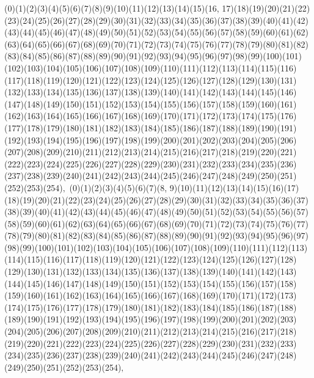 \documentclass[12pt]{article}
\begin{document}
{(0)(1)(2)(3)(4)(5)(6)(7)(8)(9)(10)(11)(12)(13)(14)(15)(16, 17)(18)(19)(20)(21)(22)(23)(24)(25)(26)(27)(28)(29)(30)(31)(32)(33)(34)(35)(36)(37)(38)(39)(40)(41)(42)(43)(44)(45)(46)(47)(48)(49)(50)(51)(52)(53)(54)(55)(56)(57)(58)(59)(60)(61)(62)(63)(64)(65)(66)(67)(68)(69)(70)(71)(72)(73)(74)(75)(76)(77)(78)(79)(80)(81)(82)(83)(84)(85)(86)(87)(88)(89)(90)(91)(92)(93)(94)(95)(96)(97)(98)(99)(100)(101)(102)(103)(104)(105)(106)(107)(108)(109)(110)(111)(112)(113)(114)(115)(116)(117)(118)(119)(120)(121)(122)(123)(124)(125)(126)(127)(128)(129)(130)(131)(132)(133)(134)(135)(136)(137)(138)(139)(140)(141)(142)(143)(144)(145)(146)(147)(148)(149)(150)(151)(152)(153)(154)(155)(156)(157)(158)(159)(160)(161)(162)(163)(164)(165)(166)(167)(168)(169)(170)(171)(172)(173)(174)(175)(176)(177)(178)(179)(180)(181)(182)(183)(184)(185)(186)(187)(188)(189)(190)(191)(192)(193)(194)(195)(196)(197)(198)(199)(200)(201)(202)(203)(204)(205)(206)(207)(208)(209)(210)(211)(212)(213)(214)(215)(216)(217)(218)(219)(220)(221)(222)(223)(224)(225)(226)(227)(228)(229)(230)(231)(232)(233)(234)(235)(236)(237)(238)(239)(240)(241)(242)(243)(244)(245)(246)(247)(248)(249)(250)(251)(252)(253)(254)$
, 
$
(0)(1)(2)(3)(4)(5)(6)(7)(8, 9)(10)(11)(12)(13)(14)(15)(16)(17)(18)(19)(20)(21)(22)(23)(24)(25)(26)(27)(28)(29)(30)(31)(32)(33)(34)(35)(36)(37)(38)(39)(40)(41)(42)(43)(44)(45)(46)(47)(48)(49)(50)(51)(52)(53)(54)(55)(56)(57)(58)(59)(60)(61)(62)(63)(64)(65)(66)(67)(68)(69)(70)(71)(72)(73)(74)(75)(76)(77)(78)(79)(80)(81)(82)(83)(84)(85)(86)(87)(88)(89)(90)(91)(92)(93)(94)(95)(96)(97)(98)(99)(100)(101)(102)(103)(104)(105)(106)(107)(108)(109)(110)(111)(112)(113)(114)(115)(116)(117)(118)(119)(120)(121)(122)(123)(124)(125)(126)(127)(128)(129)(130)(131)(132)(133)(134)(135)(136)(137)(138)(139)(140)(141)(142)(143)(144)(145)(146)(147)(148)(149)(150)(151)(152)(153)(154)(155)(156)(157)(158)(159)(160)(161)(162)(163)(164)(165)(166)(167)(168)(169)(170)(171)(172)(173)(174)(175)(176)(177)(178)(179)(180)(181)(182)(183)(184)(185)(186)(187)(188)(189)(190)(191)(192)(193)(194)(195)(196)(197)(198)(199)(200)(201)(202)(203)(204)(205)(206)(207)(208)(209)(210)(211)(212)(213)(214)(215)(216)(217)(218)(219)(220)(221)(222)(223)(224)(225)(226)(227)(228)(229)(230)(231)(232)(233)(234)(235)(236)(237)(238)(239)(240)(241)(242)(243)(244)(245)(246)(247)(248)(249)(250)(251)(252)(253)(254)$
, 
$
}
\end{document}
